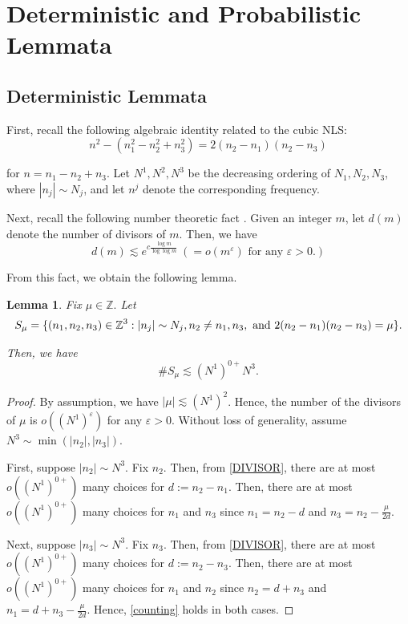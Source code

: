 \documentclass[11pt]{amsart}
\newtheorem{lemma}[theorem]{Lemma}
\numberwithin{equation}{section} \numberwithin{theorem}{section}
\begin{document}
\section{Deterministic and Probabilistic Lemmata} 

\subsection{Deterministic Lemmata}
First, recall the following algebraic identity related to the cubic NLS: 
\begin{equation}
	\label{ALGEBRA} n^2 - (n_1^2 - n_2^2 + n_3^2) = 2(n_2 - n_1) (n_2 - n_3) 
\end{equation}

{
\noindent} for $n = n_1 - n_2 + n_3$. Let $N^1, N^2, N^3$ be the decreasing ordering of $N_1, N_2, N_3$, where $|n_j| \sim N_j$, and let $n^j$ denote the corresponding frequency.

Next, recall the following number theoretic fact \cite{HW}.
Given an integer $m$, let $d(m)$ denote the number of divisors of $m$.
Then, we have
\begin{equation} \label{DIVISOR}
d(m) \lesssim e^{c \frac{\log m}{\log \log m}} \ ( = o(m^{\varepsilon}) \text{ for any }{\varepsilon}>0.)
\end{equation}

{
\noindent}
From this fact, we obtain the following lemma.

\begin{lemma}
	\label{LEM:count1} 
	Fix $\mu \in \mathbb{Z}.$ Let 
	\begin{align}
		\label{Smu} S_\mu = \{ (n_1, n_2, n_3) \in \mathbb{Z}^3: |n_j|\sim N_j, n_2 \ne n_1, n_3, \textup{ and } 2(n_2 - n_1) (n_2 - n_3) = \mu\}. \notag 
	\end{align}
	
	{
\noindent} Then, we have 
	\begin{equation}
		\label{counting} \# S_\mu \lesssim (N^1)^{0+}N^3. 
	\end{equation}
\end{lemma}
\begin{proof}
	By assumption, we have $|\mu| \lesssim (N^1)^2$. Hence, the number of the divisors of $\mu$ is $o((N^1)^{\varepsilon})$ for any ${\varepsilon} > 0$. Without loss of generality, assume $N^3 \sim \min(|n_2|, |n_3|)$.
	
	First, suppose $|n_2|\sim N^3$.  Fix $n_2$. Then, from \eqref{DIVISOR}, there are at most $o((N^1)^{0+})$ many choices for $d := n_2 - n_1$. Then, there are at most $o((N^1)^{0+})$ many choices for $n_1$ and $n_3$ since $n_1 = n_2 - d$ and $n_3 = n_2 - \frac{\mu}{2d}$.
	
	Next, suppose $|n_3|\sim N^3$. Fix $n_3$. Then, from \eqref{DIVISOR}, there are at most $o((N^1)^{0+})$ many choices for $d := n_2 - n_3$. Then, there are at most $o((N^1)^{0+})$ many choices for $n_1$ and $n_2$ since $n_2 = d + n_3$ and $n_1 = d + n_3 - \frac{\mu}{2d}$. Hence, \eqref{counting} holds in both cases. 
\end{proof}
\end{document}
